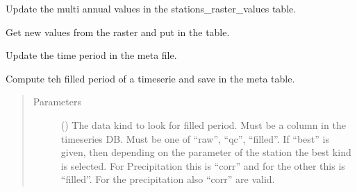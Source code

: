 \documentclass[letterpaper,10pt,english]{sphinxmanual}
\begin{document}
\begin{fulllineitems}
\begin{fulllineitems}
\begin{quote}
\begin{description}
\end{description}\end{quote}

\end{fulllineitems}


\begin{fulllineitems}
\label{\detokenize{weatherDB:weatherDB.station.StationBase.update_ma}}
\sphinxAtStartPar
Update the multi annual values in the stations\_raster\_values table.

\sphinxAtStartPar
Get new values from the raster and put in the table.

\end{fulllineitems}


\begin{fulllineitems}
\label{\detokenize{weatherDB:weatherDB.station.StationBase.update_period_meta}}
\sphinxAtStartPar
Update the time period in the meta file.

\sphinxAtStartPar
Compute teh filled period of a timeserie and save in the meta table.
\begin{quote}\begin{description}
\item[{Parameters}] \leavevmode
\sphinxAtStartPar
{} () \textendash{} The data kind to look for filled period.
Must be a column in the timeseries DB.
Must be one of “raw”, “qc”, “filled”.
If “best” is given, then depending on the parameter of the station the best kind is selected.
For Precipitation this is “corr” and for the other this is “filled”.
For the precipitation also “corr” are valid.

\end{description}\end{quote}

\end{fulllineitems}


\end{fulllineitems}
\end{document}
